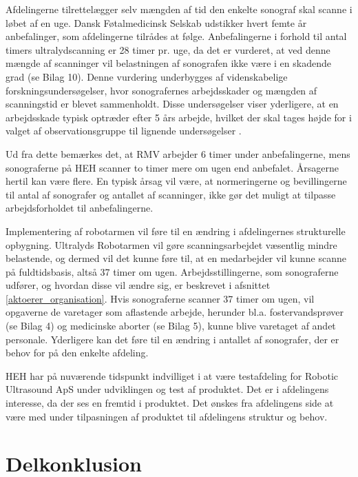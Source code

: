 Afdelingerne tilrettelægger selv mængden af tid den enkelte sonograf skal scanne i løbet af en uge. Dansk Føtalmedicinsk Selskab udstikker hvert femte år anbefalinger, som afdelingerne tilrådes at følge. Anbefalingerne i forhold til antal timers ultralydscanning er 28 timer pr. uge, da det er vurderet, at ved denne mængde af scanninger vil belastningen af sonografen ikke være i en skadende grad (se Bilag 10). Denne vurdering underbygges af videnskabelige forskningsundersøgelser, hvor sonografernes arbejdsskader og mængden af scanningstid er blevet sammenholdt. Disse undersøgelser viser yderligere, at en arbejdsskade typisk optræder efter 5 års arbejde, hvilket der skal tages højde for i valget af observationsgruppe til lignende undersøgelser \cite{35}.

Ud fra dette bemærkes det, at RMV arbejder 6 timer under anbefalingerne, mens sonograferne på HEH scanner to timer mere om ugen end anbefalet. Årsagerne hertil kan være flere. En typisk årsag vil være, at normeringerne og bevillingerne til antal af sonografer og antallet af scanninger, ikke gør det muligt at tilpasse arbejdsforholdet til anbefalingerne. 

Implementering af robotarmen vil føre til en ændring i afdelingernes strukturelle opbygning. Ultralyds Robotarmen vil gøre scanningsarbejdet væsentlig mindre belastende, og dermed vil det kunne føre til, at en medarbejder vil kunne scanne på fuldtidsbasis, altså 37 timer om ugen. Arbejdsstillingerne, som sonograferne udfører, og hvordan disse vil ændre sig, er beskrevet i afsnittet \ref{aktoerer_organisation}. Hvis sonograferne scanner 37 timer om ugen, vil opgaverne de varetager som aflastende arbejde, herunder bl.a. fostervandsprøver (se Bilag 4) og medicinske aborter (se Bilag 5), kunne blive varetaget af andet personale. Yderligere kan det føre til en ændring i antallet af sonografer, der er behov for på den enkelte afdeling. 

HEH har på nuværende tidspunkt indvilliget i at være testafdeling for Robotic Ultrasound ApS under udviklingen og test af produktet. Det er i afdelingens interesse, da der ses en fremtid i produktet. Det ønskes fra afdelingens side at være med under tilpasningen af produktet til afdelingens struktur og behov. 

\section{Delkonklusion}


